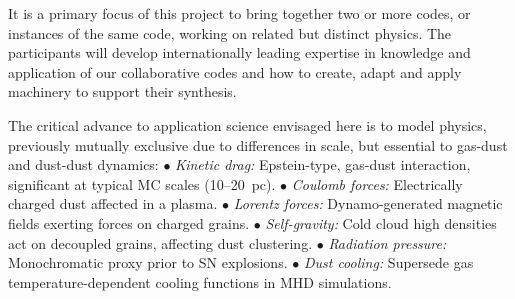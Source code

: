 \documentclass[a4paper,12pt]{article}
\newcommand{\instructions}[1]{\textcolor{blue}{#1}}
\newcommand{\answer}[1]{
	\begin{tcolorbox}[breakable, enhanced, colback=pink]
		#1
	\end{tcolorbox}
}
\begin{document}


It is a primary focus of this project to bring together two or more codes, or
instances of the same code, working on related but distinct physics. The
participants will develop internationally leading expertise in knowledge and
application of our collaborative codes and how to create, adapt and apply
machinery to support their synthesis.

\answer{
The critical advance to application science envisaged here is to model physics,
previously mutually exclusive due to differences in scale, but essential to
gas-dust and dust-dust dynamics:
\tabto{0em}
$\bullet$ {\textit{Kinetic drag:}} Epstein-type, gas-dust interaction,
significant at typical MC scales (10--20~pc).
\tabto{0em}
$\bullet$ {\textit{Coulomb forces:}} Electrically charged dust affected in a
plasma.
\tabto{0em}
$\bullet$ {\textit{Lorentz forces:}} Dynamo-generated magnetic fields exerting
forces on charged grains.
\tabto{0em}
$\bullet$ {\textit{Self-gravity:}} Cold cloud high densities act on decoupled
grains, affecting dust clustering.
\tabto{0em}
$\bullet$ {\textit{Radiation pressure:}} Monochromatic proxy prior to SN
explosions.
\tabto{0em}
$\bullet$ {\textit{Dust cooling:}} Supersede gas temperature-dependent cooling
functions in MHD simulations.
  }
\end{document}
